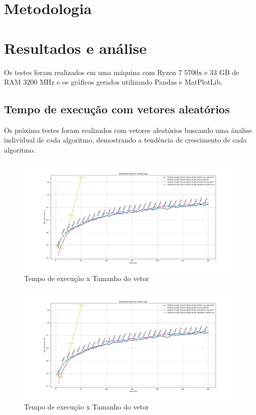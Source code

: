 \documentclass{article}
\begin{document}
\section{Metodologia}

\section{Resultados e análise}
Os testes foram realizados em uma máquina com Ryzen 7 5700x e 33 GB de RAM 3200 MHz e os gráficos gerados utilizando Pandas e MatPlotLib.

\subsection{Tempo de execução com vetores aleatórios}

Os próximo testes foram realizados com vetores aleatórios buscando uma ánalise individual de cada algoritmo, demostrando a tendência de crescimento de cada algoritmo. 

\begin{figure} [H]
    \centering
    \caption{Tempo de execução x Tamanho do vetor}
    \includegraphics[width=1\textwidth]{images/means_comparasion.png}
\end{figure}

\begin{figure} [H]
    \centering
    \caption{Tempo de execução x Tamanho do vetor}
    \includegraphics[width=1\textwidth]{images/means_comparasion.png}
\end{figure}
\end{document}

